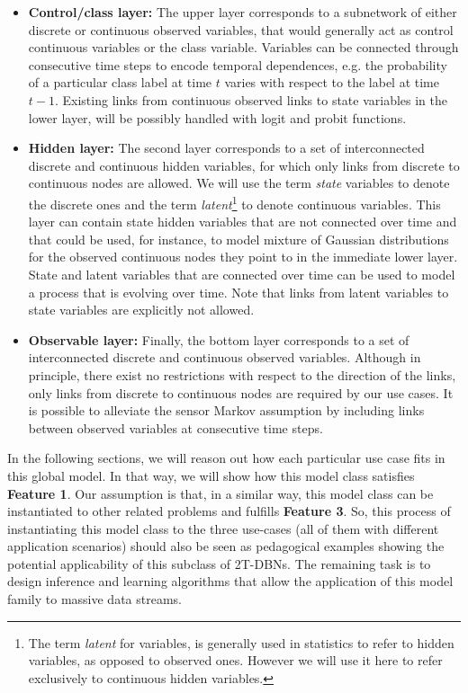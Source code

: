 \begin{itemize}

\item \textbf{Control/class layer:} The upper layer corresponds to a subnetwork of either discrete or continuous observed variables, that would generally act as control continuous variables or the class variable. Variables can be connected through consecutive time steps to encode temporal dependences, e.g. the probability of a particular class label at time $t$ varies with respect to the label at time $t-1$. Existing links from continuous observed links to state variables in the lower layer, will be possibly handled with logit and probit functions.

\item \textbf{Hidden layer:}  The second layer corresponds to a set of interconnected discrete and continuous hidden variables, for which only links from discrete to continuous nodes are allowed. We will use the term \textit{state} variables to denote the discrete ones and the term \textit{latent}\footnote{The term \textit{latent} for variables, is generally used in statistics to refer to hidden variables, as opposed to observed ones. However we will use it here to refer exclusively to continuous hidden variables.} to denote continuous variables. This layer can contain state hidden variables that are not connected over time and that could be used, for instance, to model mixture of Gaussian distributions for the observed continuous nodes they point to in the immediate lower layer. State and latent variables that are connected over time can be used to model a process that is evolving over time. Note that links from latent variables to state variables are explicitly not allowed.

\item \textbf{Observable layer:} Finally, the bottom layer corresponds to a set of interconnected discrete and continuous observed variables. Although in principle, there exist no restrictions with respect to the direction of the links, only links from discrete to continuous nodes are required by our use cases. It is possible to alleviate the sensor Markov assumption by including links between observed variables at consecutive time steps.

\end{itemize} 


In the following sections, we will reason out how each particular use case fits in this global model. In that way, we will show how this model class satisfies \textbf{Feature 1}. Our assumption is that, in a similar way, this model class can be instantiated to other related problems and fulfills \textbf{Feature 3}. So, this process of instantiating this model class to the three use-cases (all of them with different application scenarios) should also be seen as pedagogical examples showing the potential applicability of this subclass of 2T-DBNs. The remaining task is to design inference and learning algorithms that allow the application of this model family to massive data streams. 


